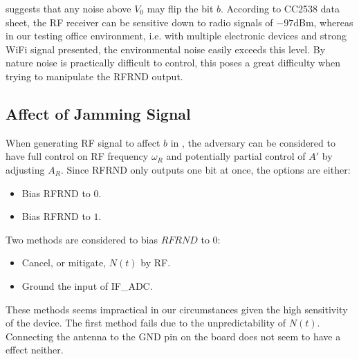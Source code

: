  suggests that any noise above $V_0$ may flip the bit $b$. According to CC2538 data sheet\cite{CC2538_Datasheet}, the RF receiver can be sensitive down to radio signals of $-97$dBm, whereas in our testing office environment, i.e. with multiple electronic devices and strong WiFi signal presented, the environmental noise easily exceeds this level. By nature noise is practically difficult to control, this poses a great difficulty when trying to manipulate the RFRND output.

\subsection{Affect of Jamming Signal}

When generating RF signal to affect $b$ in , the adversary can be considered to have full control on RF frequency $\omega_{R}$ and potentially partial control of $A'$ by adjusting $A_{R}$. Since RFRND only outputs one bit at once, the options are either:
\begin{itemize}
\item Bias RFRND to $0$. 
\item Bias RFRND to $1$.
\end{itemize}

Two methods are considered to bias $RFRND$ to $0$:
\begin{itemize}
	\item Cancel, or mitigate, $N(t)$ by RF.  
	\item Ground the input of IF\_ADC. 
\end{itemize}

These methods seems impractical in our circumstances given the high sensitivity of the device. The first method  fails due to the unpredictability of $N(t)$. Connecting the antenna to the GND pin on the board does not seem to have a effect neither.
